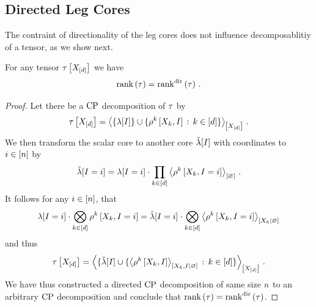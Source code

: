 \subsection{Directed Leg Cores}

The contraint of directionality of the leg cores does not influence decomposablitiy of a tensor, as we show next.

\begin{lemma}
    \label{lem:cprankEqualsDir}
    For any tensor $\tau\left[X_{[d]}\right]$ we have
    \begin{align*}
        \mathrm{rank}\left(\tau\right) = \mathrm{rank}^{\mathrm{dir}}\left(\tau\right) \, .
    \end{align*}
\end{lemma}
\begin{proof}
    Let there be a $\mathrm{CP}$ decomposition of $\tau$ by
    \begin{align*}
        \tau\left[X_{[d]}\right]
        = \left\langle 
            \{\lambda[I]\} \cup \{ \rho^{k}\left[X_{k},I\right] \,:\, k\in[d] \}
        \right\rangle_{\left[ X_{[d]} \right]} \, .
    \end{align*}
    We then transform the scalar core to another core $\tilde{\lambda}[I]$ with coordinates to $i\in[n]$ by
    \begin{align*}
        \tilde{\lambda}[I=i]
        = \lambda[I=i] \cdot \prod_{k\in[d]} \left\langle \rho^{k}\left[X_{k},I=i\right]\right\rangle_{\left[ \varnothing \right]} \, .
    \end{align*}
    It follows for any $i\in[n]$, that
    \begin{align*}
        \lambda[I=i] \cdot \bigotimes_{k\in[d]}\rho^{k}\left[X_{k},I=i\right]
        = \tilde{\lambda}[I=i] \cdot \bigotimes_{k\in[d]}\left\langle \rho^{k}\left[X_{k},I=i\right]\right\rangle_{\left[ X_{k} | \varnothing \right]}
    \end{align*}
    and thus
    \begin{align*}
        \tau\left[X_{[d]}\right]
        = \left\langle 
            \{\tilde{\lambda}[I] \cup \{ \left\langle \rho^{k}\left[X_{k},I\right]\right\rangle_{\left[ X_{k},I | \varnothing \right]} \,:\, k\in[d] \}
        \right\rangle_{\left[ X_{[d]} \right]} \, .
    \end{align*}
    We have thus constructed a directed $\mathrm{CP}$ decomposition of same size $n$ to an arbitrary $\mathrm{CP}$ decomposition and conclude that $\mathrm{rank}\left(\tau\right) = \mathrm{rank}^{\mathrm{dir}}\left(\tau\right)$.
\end{proof}

